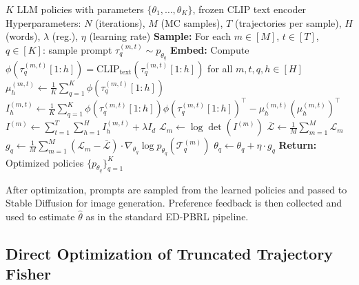 \documentclass{article}
\begin{document}
\begin{algorithm}[H]
\caption{ED-PBRL with REINFORCE (Vocabulary-Free)}
\label{alg:reinforce}
\begin{algorithmic}[1]
\REQUIRE $K$ LLM policies with parameters $\{\theta_1, \ldots, \theta_K\}$, frozen CLIP text encoder
\REQUIRE Hyperparameters: $N$ (iterations), $M$ (MC samples), $T$ (trajectories per sample), $H$ (words), $\lambda$ (reg.), $\eta$ (learning rate)
    \STATE \textbf{Sample:} For each $m \in [M]$, $t \in [T]$, $q \in [K]$: sample prompt $\tau_q^{(m,t)} \sim p_{\theta_q}$
    \STATE \textbf{Embed:} Compute $\phi(\tau_q^{(m,t)}[1:h]) = \text{CLIP}_{\text{text}}(\tau_q^{(m,t)}[1:h])$ for all $m, t, q, h \in [H]$
                \STATE $\mu_h^{(m,t)} \leftarrow \frac{1}{K}\sum_{q=1}^K \phi(\tau_q^{(m,t)}[1:h])$
                \STATE $I_h^{(m,t)} \leftarrow \frac{1}{K}\sum_{q=1}^K \phi(\tau_q^{(m,t)}[1:h])\phi(\tau_q^{(m,t)}[1:h])^\top - \mu_h^{(m,t)}(\mu_h^{(m,t)})^\top$
            \ENDFOR
        \ENDFOR
        \STATE $I^{(m)} \leftarrow \sum_{t=1}^{T} \sum_{h=1}^{H} I_h^{(m,t)} + \lambda I_d$ \hfill {}
        \STATE $\mathcal{L}_m \leftarrow \log\det(I^{(m)})$
    \ENDFOR
    \STATE $\bar{\mathcal{L}} \leftarrow \frac{1}{M}\sum_{m=1}^M \mathcal{L}_m$ \hfill {}
        \STATE $g_q \leftarrow \frac{1}{M} \sum_{m=1}^{M} (\mathcal{L}_m - \bar{\mathcal{L}}) \cdot \nabla_{\theta_q} \log p_{\theta_q}(\mathcal{T}_q^{(m)})$ \hfill {}
        \STATE $\theta_q \leftarrow \theta_q + \eta \cdot g_q$ \hfill {}
    \ENDFOR
\ENDFOR
\STATE \textbf{Return:} Optimized policies $\{p_{\theta_q}\}_{q=1}^K$
\end{algorithmic}
\end{algorithm}

After optimization, prompts are sampled from the learned policies and passed to Stable Diffusion for image generation. Preference feedback is then collected and used to estimate $\hat{\theta}$ as in the standard ED-PBRL pipeline.

\subsection{Direct Optimization of Truncated Trajectory Fisher}
\label{sec:reinforce:comparison}
\end{document}
